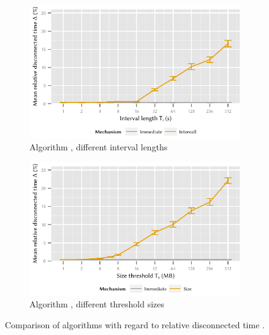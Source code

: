 \begin{figure}
	\begin{subfigure}[b]{\textwidth}
	\centering
	\includegraphics{application/cloud_file_synchronization/numerical_evaluation/figures/interval_disconnected}
	\caption{Algorithm \algointerval, different interval lengths \thresholdInterval}\label{fig:application:cloud_file_synchronisation:numerical_evaluation:disconnected:disconnected:interval}
	\end{subfigure} 
	\begin{subfigure}[b]{\textwidth}
	\centering
	\includegraphics{application/cloud_file_synchronization/numerical_evaluation/figures/size_disconnected}
	\caption{Algorithm \algosize, different threshold sizes \thresholdSize}\label{fig:application:cloud_file_synchronisation:numerical_evaluation:disconnected:disconnected:size}
	\end{subfigure}

	\caption{Comparison of algorithms with regard to relative disconnected time \relativeDisconnectedTime.}\label{fig:application:cloud_file_synchronisation:numerical_evaluation:disconnected:disconnected}
\end{figure}

